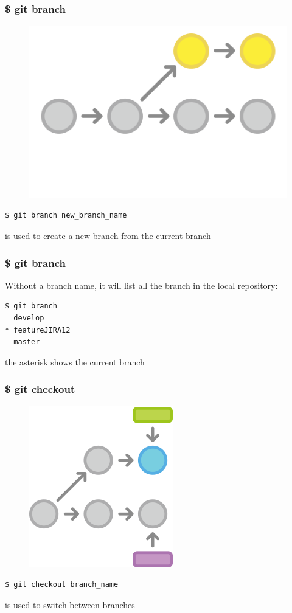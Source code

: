 \documentclass{beamer}
\begin{document}
\begin{frame}[fragile]
    \frametitle{\$ git branch}
    \begin{figure}[h!]
        \begin{center}
            \includegraphics[scale=0.4]{branch.png}
        \end{center}
    \end{figure}
    \begin{verbatim}
$ git branch new_branch_name
    \end{verbatim}
    is used to create a new branch from the current branch
\end{frame}

\begin{frame}[fragile]
    \frametitle{\$ git branch}
    Without a branch name, it will list all the branch in the local repository:
    \begin{verbatim}
$ git branch
  develop
* featureJIRA12
  master
    \end{verbatim}
the asterisk shows the current branch
\end{frame}

\begin{frame}[fragile]
    \frametitle{\$ git checkout}
    \begin{figure}[h!]
        \begin{center}
            \includegraphics[scale=0.5]{checkout.png}
        \end{center}
    \end{figure}
    \begin{verbatim}
$ git checkout branch_name
    \end{verbatim}
    is used to switch between branches
\end{frame}
\end{document}
